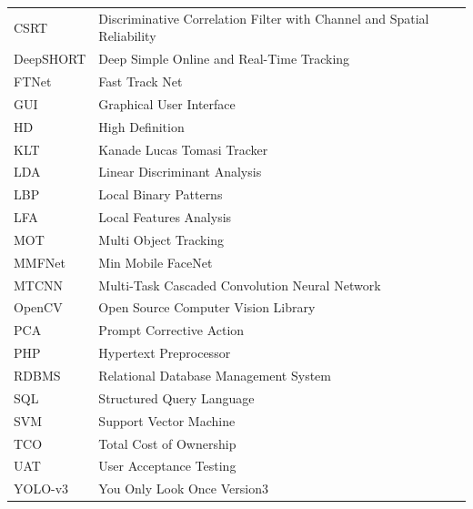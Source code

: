 		\begin{tabular}{p{1in}p{4in}}
CSRT & Discriminative Correlation Filter with Channel and Spatial Reliability\\
DeepSHORT & Deep Simple Online and Real-Time Tracking\\
FTNet & Fast Track Net\\
GUI & Graphical User Interface\\
HD & High Definition\\
KLT & Kanade Lucas Tomasi Tracker\\
LDA & Linear Discriminant Analysis\\
LBP & Local Binary Patterns\\
LFA & Local Features Analysis\\
MOT & Multi Object Tracking\\
MMFNet & Min Mobile FaceNet\\
MTCNN & Multi-Task Cascaded Convolution Neural Network\\
OpenCV & Open Source Computer Vision Library\\
PCA & Prompt Corrective Action\\
PHP & Hypertext Preprocessor\\
RDBMS & Relational Database Management System\\
SQL & Structured Query Language\\
SVM & Support Vector Machine\\
TCO & Total Cost of Ownership\\
UAT & User Acceptance Testing\\
YOLO-v3 & You Only Look Once Version3\\

		\end{tabular}
		\break
